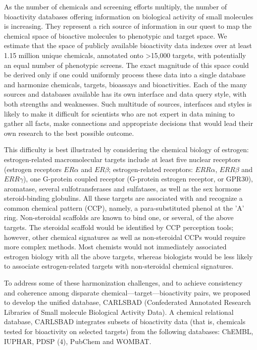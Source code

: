 As the number of chemicals and screening efforts multiply, the number of bioactivity databases offering information on biological activity of small molecules is increasing. They represent a rich source of information in our quest to map the chemical space of bioactive molecules to phenotypic and target space. We estimate that the space of publicly available bioactivity data indexes over at least 1.15 million unique chemicals, annotated onto \textgreater 15,000 targets\cite{Kim_Kjaerulff2013-hi}, with potentially an equal number of phenotypic screens. The exact magnitude of this space could be derived only if one could uniformly process these data into a single database and harmonize chemicals, targets, bioassays and bioactivities. Each of the many sources and databases available has its own interface and data query style, with both strengths and weaknesses. Such multitude of sources, interfaces and styles is likely to make it difficult for scientists who are not expert in data mining to gather all facts, make connections and appropriate decisions that would lead their own research to the best possible outcome.

This difficulty is best illustrated by considering the chemical biology of estrogen: estrogen-related macromolecular targets include at least five nuclear receptors (estrogen receptors $ER\alpha$ and $ER\beta$; estrogen-related receptors: $ERR\alpha$, $ERR\beta$ and $ERR\gamma$), one G-protein coupled receptor (G-protein estrogen receptor, or GPR30), aromatase, several sulfotransferases and sulfatases, as well as the sex hormone steroid-binding globulins. All these targets are associated with and recognize a common chemical pattern (CCP), namely, a para-substituted phenol at the 'A' ring. Non-steroidal scaffolds are known to bind one, or several, of the above targets. The steroidal scaffold would be identified by CCP perception tools; however, other chemical signatures as well as non-steroidal CCPs would require more complex methods. Most chemists would not immediately associated estrogen biology with all the above targets, whereas biologists would be less likely to associate estrogen-related targets with non-steroidal chemical signatures.

To address some of these harmonization challenges, and to achieve consistency and coherence among disparate chemical—target—bioactivity pairs, we proposed to develop the unified database, CARLSBAD (Confederated Annotated Research Libraries of Small molecule Biological Activity Data). A chemical relational database, CARLSBAD integrates subsets of bioactivity data (that is, chemicals tested for bioactivity on selected targets) from the following databases: ChEMBL\cite{Gaulton2017-gp}, IUPHAR\cite{Harding2018-ut}, PDSP\cite{Roth2000-bh} (4), PubChem\cite{Kim2021-dv} and WOMBAT\cite{Olah2005-zd}.

